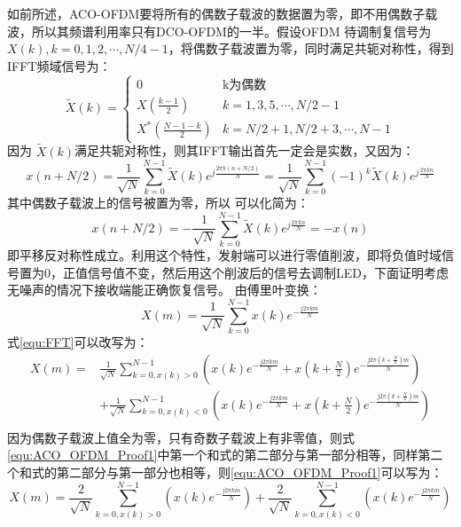 如前所述，ACO-OFDM要将所有的偶数子载波的数据置为零，即不用偶数子载波，所以其频谱利用率只有DCO-OFDM的一半。假设OFDM 待调制复信号为$X(k),k=0,1,2,\cdots,N/4-1$，将偶数子载波置为零，同时满足共轭对称性，得到IFFT频域信号为：
\begin{equation}
    \tilde{X}(k) =
    \begin{cases}
        0 & \text{k为偶数} \\
        X(\frac{k-1}{2}) & k = 1, 3, 5, \cdots, N/2-1 \\
        X^*(\frac{N-1-k}{2}) & k = N/2+1, N/2+3, \cdots, N-1
    \end{cases}
    \label{equ:ACO_OFDM_Freq}
\end{equation}
因为 $\tilde{X}(k)$满足共轭对称性，则其IFFT输出首先一定会是实数，又因为：
\begin{equation}
    x(n+N/2) = \frac{1}{\sqrt{N}}\sum \limits_{k=0}^{N-1}\tilde{X}(k) e^{j\frac{2\pi k(n+N/2)}{N}} = \frac{1}{\sqrt{N}} \sum \limits_{k=0}^{N-1} (-1)^k\tilde{X}(k)e^{j\frac{2\pi kn}{N}}
    \label{equ:ACO_OFDM_equ1}
\end{equation}
其中偶数子载波上的信号被置为零，所以\label{equ_ACO_OFDM_equ1} 可以化简为：
\begin{equation}
    x(n+N/2) = -\frac{1}{\sqrt{N}} \sum \limits_{k=0}^{N-1} \tilde{X}(k)e^{j\frac{2\pi kn}{N}} = -x(n)
\end{equation}
即平移反对称性成立。利用这个特性，发射端可以进行零值削波，即将负值时域信号置为0，正值信号值不变，然后用这个削波后的信号去调制LED，下面证明考虑无噪声的情况下接收端能正确恢复信号。
由傅里叶变换：
\begin{equation}
    X(m) = \frac{1}{\sqrt{N}}\sum \limits_{k=0}^{N-1}x(k)e^{-\frac{j2\pi km}{N}}
    \label{equ:FFT}
\end{equation}
式\ref{equ:FFT}可以改写为：
\begin{align}
\label{equ:ACO_OFDM_Proof1}
    X(m) = &\frac{1}{\sqrt{N}}\sum \limits_{k=0, x(k)>0}^{N-1}\left(x(k)e^{-\frac{j2\pi km}{N}}+x(k+\frac{N}{2})e^{-\frac{j2\pi (k+\frac{N}{2})m}{N}}\right)\nonumber \\
         &+\frac{1}{\sqrt{N}}\sum \limits_{k=0, x(k)<0}^{N-1}\left(x(k)e^{-\frac{j2\pi km}{N}}+x(k+\frac{N}{2})e^{-\frac{j2\pi (k+\frac{N}{2})m}{N}}\right) \nonumber\\
\end{align}
因为偶数子载波上值全为零，只有奇数子载波上有非零值，则式\ref{equ:ACO_OFDM_Proof1}中第一个和式的第二部分与第一部分相等，同样第二个和式的第二部分与第一部分也相等，则\ref{equ:ACO_OFDM_Proof1}可以写为：
\begin{equation}
X(m) = \frac{2}{\sqrt{N}}\sum \limits_{k=0, x(k)>0}^{N-1}(x(k)e^{-\frac{j2\pi km}{N}}) + \frac{2}{\sqrt{N}}\sum \limits_{k=0, x(k)<0}^{N-1}(x(k)e^{-\frac{j2\pi km}{N}})
\label{equ:ACO_OFDM_Proof2}
\end{equation}

